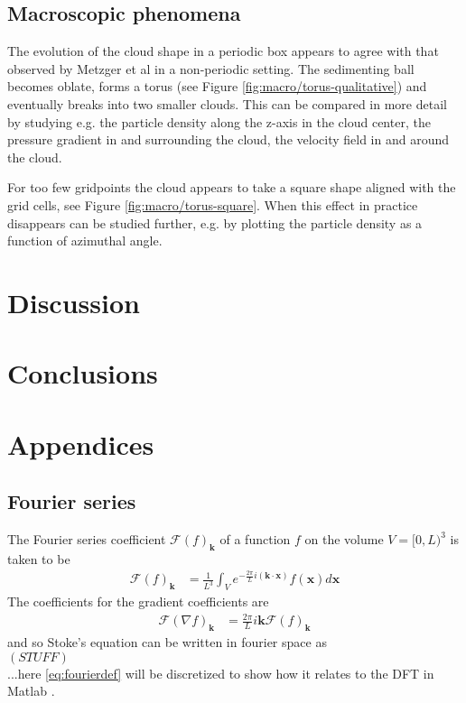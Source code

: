 \documentclass[a4paper,
twoside=false,abstract=false,numbers=noenddot,
titlepage=false,headings=small,parskip=half,version=last]{scrartcl}
\begin{document}
\subsection{Macroscopic phenomena}
The evolution of the cloud shape in a periodic box appears to agree with that observed by Metzger et al \cite{fallingclouds} in a non-periodic setting.
The sedimenting ball becomes oblate, forms a torus (see Figure \ref{fig:macro/torus-qualitative}) and eventually breaks into two smaller clouds.
This can be compared in more detail by studying e.g. the particle density along the z-axis in the cloud center, the pressure gradient in and surrounding the cloud, the velocity field in and around the cloud.\\

For too few gridpoints the cloud appears to take a square shape aligned with the grid cells, see Figure \ref{fig:macro/torus-square}. When this effect in practice disappears can be studied further, e.g. by plotting the particle density as a function of azimuthal angle.

\section{Discussion}

\section{Conclusions}





\section{Appendices}
\subsection{Fourier series}
The Fourier series coefficient $\mathcal{F}(f)_{\mathbf{k}}$ of a function $f$ on the volume $V=[0,L)^3$ is taken to be
\begin{align}
\mathcal{F}(f)_{\mathbf{k}} &= \frac{1}{L^3} \int_V e^{-\frac{2\pi}{L}i(\mathbf{k}\cdot \mathbf{x})}f(\mathbf{x})d\mathbf{x}
    \label{eq:fourierdef}
\end{align}
The coefficients for the gradient coefficients are
\begin{align}
\mathcal{F}(\nabla f)_{\mathbf{k}} &= \frac{2\pi}{L}i\mathbf{k} \mathcal{F}(f)_{\mathbf{k}}
\end{align}
and so Stoke's equation can be written in fourier space as \\
$\left(STUFF\right)$\\
...here \eqref{eq:fourierdef} will be discretized to show how it relates to the DFT in Matlab \cite{matlab}.
\end{document}
